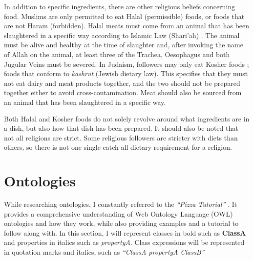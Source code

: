 In addition to specific ingredients, there are other religious beliefs concerning food. Muslims are only permitted to eat Halal (permissible) foods, or foods that are not Haram (forbidden). Halal meats must come from an animal that has been slaughtered in a specific way according to Islamic Law (Shari'ah) \cite{halal_monitoring_committee_2018}. The animal must be alive and healthy at the time of slaughter and, after invoking the name of Allah on the animal, at least three of the Trachea, Oesophagus and both Jugular Veins must be severed. In Judaism, followers may only eat Kosher foods \cite{kosher_2023} ; foods that conform to \textit{kashrut} (Jewish dietary law). This specifies that they must not eat dairy and meat products together, and the two should not be prepared together either to avoid cross-contamination. Meat should also be sourced from an animal that has been slaughtered in a specific way.

Both Halal and Kosher foods do not solely revolve around what ingredients are in a dish, but also how that dish has been prepared. It should also be noted that not all religions are strict. Some religious followers are stricter with diets than others, so there is not one single catch-all dietary requirement for a religion.


\section{Ontologies}

While researching ontologies, I constantly referred to the \textit{``Pizza Tutorial''} \cite{pizza_tutorial_site}. It provides a comprehensive understanding of Web Ontology Language (OWL) ontologies and how they work, while also providing examples and a tutorial to follow along with. In this section, I will represent classes in bold such as \textbf{ClassA} and properties in italics such as \textit{propertyA}. Class expressions will be represented in quotation marks and italics, such as \textit{``ClassA propertyA ClassB''}

